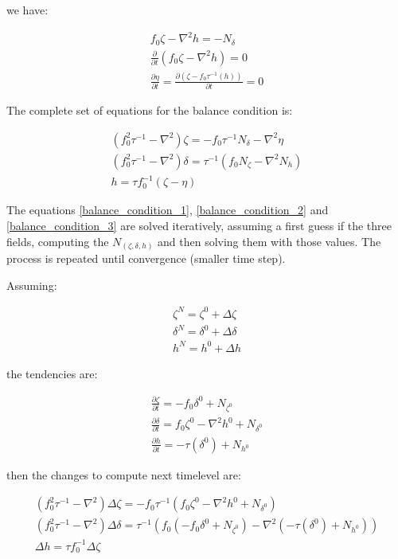we have:

\begin{gather}
  f_0 \zeta - \nabla^2 h = -N_{\delta} \\
  \frac{\partial}{\partial t}\left( f_0 \zeta - \nabla^2 h\right) = 0 \\
  \frac{\partial \eta}{\partial t} = 
   \frac{\partial \left(\zeta - f_0 \tau^{-1}(h)\right)}{\partial t} = 0
\end{gather}

The complete set of equations for the balance condition is:

\begin{gather}
  \label{balance_condition_1}
  \left(f_0^2 \tau^{-1} - \nabla^2\right) \zeta =
      -f_0\tau^{-1} N_{\delta} - \nabla^2 \eta \\
  \label{balance_condition_2}
  \left(f_0^2 \tau^{-1} - \nabla^2\right) \delta =
      \tau^{-1}\left(f_0 N_{\zeta} - \nabla^2 N_h \right) \\
  \label{balance_condition_3}
  h = \tau f_0^{-1}\left(\zeta - \eta\right)
\end{gather}

The equations \ref{balance_condition_1}, \ref{balance_condition_2} and
\ref{balance_condition_3} are solved iteratively, assuming a first guess if
the three fields, computing the $N_{(\zeta,\delta,h)}$ and then solving
them with those values. The process is repeated until convergence (smaller
time step).

Assuming:

\begin{gather}
  \zeta^N = \zeta^0 + \Delta \zeta \\
  \delta^N = \delta^0 + \Delta \delta \\
  h^N = h^0 + \Delta h
\end{gather}

the tendencies are:

\begin{gather}
  \frac{\partial \zeta}{\partial t} = -f_0 \delta^0 + N_{\zeta^0} \\
  \frac{\partial \delta}{\partial t} = f_0 \zeta^0 -
     \nabla^2 h^0 + N_{\delta^0} \\
  \frac{\partial h}{\partial t} = -\tau(\delta^0) + N_{h^0}
\end{gather}

then the changes to compute next timelevel are:

\begin{gather}
  \label{nextlev1}
  \left(f_0^2\tau^{-1}-\nabla^2\right) \Delta\zeta =
  -f_0 \tau^{-1} \left(f_0 \zeta^0-\nabla^2 h^0 + N_{\delta^0} \right) \\
  \label{nextlev2}
  \left(f_0^2\tau^{-1}-\nabla^2\right) \Delta\delta =
  \tau^{-1} \left(f_0 (-f_0 \delta^0 + N_{\zeta^0}) -
  \nabla^2(-\tau(\delta^0) + N_{h^0})\right) \\
  \label{nextlev3}
  \Delta h = \tau f_0^{-1} \Delta \zeta
\end{gather}

